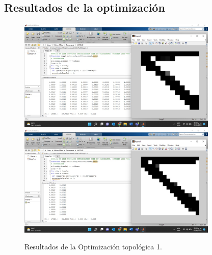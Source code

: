 \documentclass{article}
\begin{document}
\subsection{Resultados de la optimización}
\begin{figure}[htp]
 \centering
   { \includegraphics[width=0.85\textwidth]{1.jpeg}}
   {\includegraphics[width=0.85\textwidth]{2.jpeg}}
     \caption{Resultados de la Optimización topológica 1.}
\end{figure}
   
\end{document}
